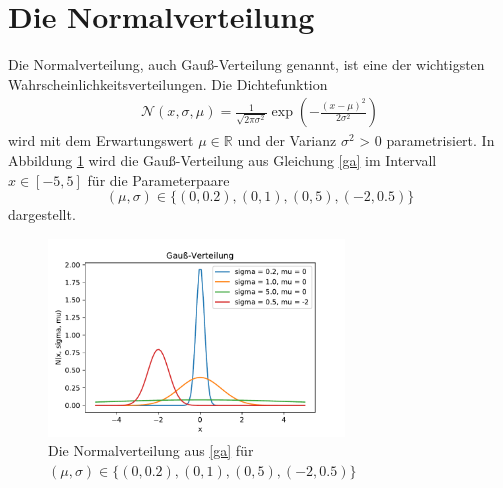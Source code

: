 \documentclass[12pt,ngerman,a4paper]{scrartcl}
\begin{document}
\section{\hspace{3mm}Die Normalverteilung}
Die Normalverteilung, auch Gauß-Verteilung genannt, ist eine der wichtigsten Wahrscheinlichkeitsverteilungen. Die Dichtefunktion
\begin{align}
 \mathcal{N}(x, \sigma, \mu) = \frac{1}{\sqrt{2\pi \sigma^2}} \exp \left(-\frac{(x-\mu)^2}{2\sigma^2}\right) 
 \label{ga}
 \end{align} wird mit dem Erwartungswert $\mu \in \mathbb{R}$ und der Varianz $\sigma^2$ > 0 parametrisiert. In Abbildung \ref{Abb} wird die Gauß-Verteilung aus Gleichung \eqref{ga} im Intervall $x \in [-5, 5]$ für die Parameterpaare \[(\mu, \sigma) \in \{(0,0.2), (0,1), (0,5), (-2, 0.5)\}\] dargestellt.\\
 
\begin{figure}[h!]
\begin{center}
\includegraphics[width=0.7\textwidth]{1.pdf}
\caption{Die Normalverteilung aus \eqref{ga} für $(\mu, \sigma) \in \{(0,0.2), (0,1), (0,5), (-2, 0.5)\}$}
\label{Abb}
\end{center}
\end{figure}
\end{document}
